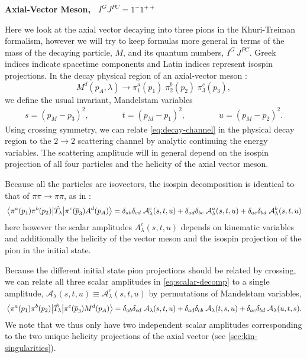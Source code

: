 \documentclass[10pt, aps,prd,amsmath,amssymb,superscriptaddress,onecolumn,
nofootinbib,showpacs,preprintnumbers]{revtex4-1}
\begin{document}
\begin{center}
\large \textbf{Axial-Vector Meson, \, \(I^G J^{PC} = 1^-1^{++}\)}
\end{center}
Here we look at the axial vector decaying into three pions in the Khuri-Treiman formalism, however we will try to keep formulas more general in terms of the mass of the decaying particle, \(M\), and its quantum numbers, \(I^G \, J^{PC}\). Greek indices indicate spacetime components and Latin indices represent isospin projections.
In the decay physical region of an axial-vector meson :
  \begin{equation}
    \label{eq:decay-channel}
    M^d(p_A, \lambda) \rightarrow \pi_1^a(p_1)\;  \pi_2^b(p_2) \; \pi^c_3(p_3),
  \end{equation}
we define the usual invariant, Mandelstam variables
  \begin{align}
    s = (p_M - p_3)^2,  \qquad \qquad t = (p_M - p_1)^2,  \qquad  \qquad u = (p_M-p_2)^2.
  \end{align}
Using crossing symmetry, we can relate \cref{eq:decay-channel} in the physical decay region to the \(2\to2\) scattering channel by analytic continuing the energy variables. The scattering amplitude will in general depend on the isospin projection of all four particles and the helicity of the axial vector meson.

Because all the particles are isovectors, the isospin decomposition is identical to that of \(\pi\pi\to\pi\pi\), as in \cite{Albaladejo2018}:
  \begin{equation}
    \mel{\pi^a(p_1)\pi^b(p_2)}{\hat{T_\lambda}}{\pi^c(\overline{p}_3)A^d(p_A)} = \delta_{ab}\delta_{cd} \; \mathcal{A}^{c}_\lambda(s,t,u) + \delta_{ad}\delta_{bc} \; \mathcal{A}^{a}_\lambda(s,t,u) + \delta_{ac}\delta_{bd} \; \mathcal{A}^{b}_\lambda(s,t,u)
  \end{equation}
  here however the scalar amplitudes \(A^c_\lambda(s,t,u)\) depends on kinematic variables and additionally the helicity of the vector meson and the isospin projection of the pion in the initial state.

Because the different initial state pion projections should be related by crossing, we can relate all three scalar amplitudes in \cref{eq:scalar-decomp} to a single amplitude, \(\mathcal{A}_\lambda(s,t,u) \equiv \mathcal{A}_\lambda^{c}(s,t,u)\) by permutations of Mandelstam variables,
\begin{equation}
  \label{eq:scalar-decomp}
  \mel{\pi^a(p_1)\pi^b(p_2)}{\hat{T_\lambda}}{\pi^c(\overline{p}_3)M^d(p_A)} = \delta_{ab}\delta_{cd} \; \mathcal{A}_\lambda(s,t,u) + \delta_{ad}\delta_{cb} \; \mathcal{A}_\lambda(t,s,u) + \delta_{ac}\delta_{bd} \; \mathcal{A}_\lambda(u,t,s).
\end{equation}
We note that we thus only have two independent scalar amplitudes corresponding to the two unique helicity projections of the axial vector (see \cref{sec:kin-singularities}).
\end{document}
